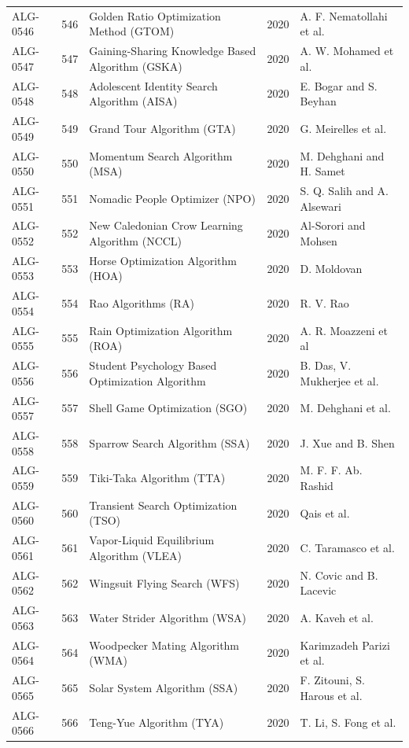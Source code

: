\documentclass[8pt]{article}
\begin{document}
\begin{landscape}
\begin{longtable}{P{1.7cm}rP{10.0cm}rP{7.2cm}}
ALG-0546 & 546 & Golden Ratio Optimization Method (GTOM) & 2020 & A. F. Nematollahi et al. \\
ALG-0547 & 547 & Gaining-Sharing Knowledge Based Algorithm (GSKA) & 2020 & A. W. Mohamed et al. \\
ALG-0548 & 548 & Adolescent Identity Search Algorithm (AISA) & 2020 & E. Bogar and S. Beyhan \\
ALG-0549 & 549 & Grand Tour Algorithm (GTA) & 2020 & G. Meirelles et al. \\
ALG-0550 & 550 & Momentum Search Algorithm (MSA) & 2020 & M. Dehghani and H. Samet \\
ALG-0551 & 551 & Nomadic People Optimizer (NPO) & 2020 & S. Q. Salih and A. Alsewari \\
ALG-0552 & 552 & New Caledonian Crow Learning Algorithm (NCCL) & 2020 & Al-Sorori and Mohsen \\
ALG-0553 & 553 & Horse Optimization Algorithm (HOA) & 2020 & D. Moldovan \\
ALG-0554 & 554 & Rao Algorithms (RA) & 2020 & R. V. Rao \\
ALG-0555 & 555 & Rain Optimization Algorithm (ROA) & 2020 & A. R. Moazzeni et al \\
ALG-0556 & 556 & Student Psychology Based Optimization Algorithm & 2020 & B. Das, V. Mukherjee et al. \\
ALG-0557 & 557 & Shell Game Optimization (SGO) & 2020 & M. Dehghani et al. \\
ALG-0558 & 558 & Sparrow Search Algorithm (SSA) & 2020 & J. Xue and B. Shen \\
ALG-0559 & 559 & Tiki-Taka Algorithm (TTA) & 2020 & M. F. F. Ab. Rashid \\
ALG-0560 & 560 & Transient Search Optimization (TSO) & 2020 & Qais et al. \\
ALG-0561 & 561 & Vapor-Liquid Equilibrium Algorithm (VLEA) & 2020 & C. Taramasco et al. \\
ALG-0562 & 562 & Wingsuit Flying Search (WFS) & 2020 & N. Covic and B. Lacevic \\
ALG-0563 & 563 & Water Strider Algorithm (WSA) & 2020 & A. Kaveh et al. \\
ALG-0564 & 564 & Woodpecker Mating Algorithm (WMA) & 2020 & Karimzadeh Parizi et al. \\
ALG-0565 & 565 & Solar System Algorithm (SSA) & 2020 & F. Zitouni, S. Harous et al. \\
ALG-0566 & 566 & Teng-Yue Algorithm (TYA) & 2020 & T. Li, S. Fong et al. \\

\end{longtable}
\end{landscape}
\end{document}

